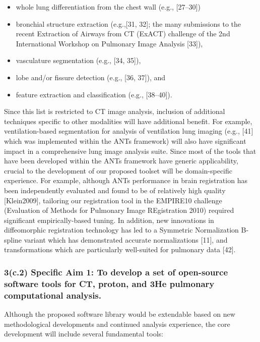 \documentclass[11pt,]{article}
\begin{document}
\begin{itemize}
\itemsep1pt\parskip0pt
\item
  whole lung differentiation from the chest wall (e.g., {[}27--30{]})
\item
  bronchial structure extraction (e.g.,{[}31, 32{]}; the many
  submissions to the recent Extraction of Airways from CT (ExACT)
  challenge of the 2nd International Workshop on Pulmonary Image
  Analysis {[}33{]}),
\item
  vasculature segmentation (e.g., {[}34, 35{]}),
\item
  lobe and/or fissure detection (e.g., {[}36, 37{]}), and
\item
  feature extraction and classification (e.g., {[}38--40{]}).
\end{itemize}

Since this list is restricted to CT image analysis, inclusion of
additional techniques specific to other modalities will have additional
benefit. For example, ventilation-based segmentation for analysis of
ventilation lung imaging (e.g., {[}41{]} which was implemented within
the ANTs framework) will also have significant impact in a comprehensive
lung image analysis suite. Since most of the tools that have been
developed within the ANTs framework have generic applicability, crucial
to the development of our proposed toolset will be domain-specific
experience. For example, although ANTs performance in brain registration
has been independently evaluated and found to be of relatively high
quality {[}Klein2009{]}, tailoring our registration tool in the EMPIRE10
challenge (Evaluation of Methods for Pulmonary Image REgistration 2010)
required significant empirically-based tuning. In addition, new
innovations in diffeomorphic registration technology has led to a
Symmetric Normalization B-spline variant which has demonstrated accurate
normalizations {[}11{]}, and transformations which are particularly
well-suited for pulmonary data {[}42{]}.

\subsubsection{3(c.2) Specific Aim 1: To develop a set of open-source
software tools for CT, proton, and 3He pulmonary computational
analysis.}\label{c.2-specific-aim-1-to-develop-a-set-of-open-source-software-tools-for-ct-proton-and-3he-pulmonary-computational-analysis.}

Although the proposed software library would be extendable based on new
methodological developments and continued analysis experience, the core
development will include several fundamental tools:
\end{document}
